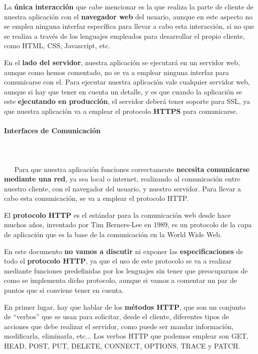 La \textbf{única interacción} que cabe mencionar es la que realiza la parte de cliente de nuestra aplicación con el \textbf{navegador web} del usuario, aunque en este aspecto no se emplea ninguna interfaz específica para llevar a cabo esta interacción, si no que se realiza a través de los lenguajes empleados para desarrollar el propio cliente, como HTML, CSS, Javascript, etc.

En el \textbf{lado del servidor}, nuestra aplicación se ejecutará en un servidor web, aunque como hemos comentado, no se va a emplear ninguna interfaz para comunicarse con el. Para ejecutar nuestra aplicación vale cualquier servidor web, aunque si hay que tener en cuenta un detalle, y es que cuando la aplicación se este \textbf{ejecutando en producción}, el servidor deberá tener soporte para \gls{SSL}, ya que nuestra aplicación va a emplear el protocolo \textbf{HTTPS} para comunicarse.

\paragraph{Interfaces de Comunicación}
~\\\\
\-\ \-\ \-\ Para que nuestra aplicación funciones correctamente \textbf{necesita comunicarse mediante una red}, ya sea local o internet, realizando al comunicación entre nuestro cliente, con el navegador del usuario, y nuestro servidor. Para llevar a cabo esta comunicación, se va a emplear el protocolo \gls{HTTP}.

El \textbf{protocolo HTTP} es el estándar para la comunicación web desde hace muchos años, inventado por Tim Berners-Lee en 1989, es un protocolo de la capa de aplicación que es la base de la comunicación en la World Wide Web. \cite{wiki01}

En este documento \textbf{no vamos a discutir} ni exponer las \textbf{especificaciones} de todo el \textbf{protocolo HTTP}, ya que el uso de este protocolo se va a realizar mediante funciones predefinidas por los lenguajes sin tener que preocuparnos de como se implementa dicho protocolo, aunque si vamos a comentar un par de puntos que si conviene tener en cuenta.

En primer lugar, hay que hablar de los \textbf{métodos HTTP}, que son un conjunto de ``verbos'' que se usan para solicitar, desde el cliente, diferentes tipos de acciones que debe realizar el servidor, como puede ser mandar información, modificarla, eliminarla, etc... Los verbos HTTP que podemos emplear son GET, HEAD, POST, PUT, DELETE, CONNECT, OPTIONS, TRACE y PATCH. \cite{mdn01}


